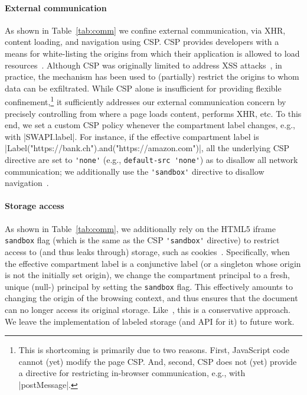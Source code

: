  
\paragraph{External communication}
%
As shown in Table~\ref{tab:comm} we confine external communication,
via XHR, content loading, and navigation using CSP.
%
CSP provides developers with a
means for white-listing the origins from which their application is
allowed to load resources~\cite{csp}.
%
Although CSP was originally limited to address XSS
attacks~\cite{kerschbaum2007simple}, in practice, the mechanism has
been used to (partially) restrict the origins to whom data can be
exfiltrated.
%
While CSP alone is insufficient for providing flexible
confinement,\footnote{
This is shortcoming is primarily due to two reasons. First,
JavaScript code cannot (yet) modify the page CSP.
And, second, CSP does not (yet) provide a directive for restricting 
in-browser communication, e.g., with \js|postMessage|.
}
it sufficiently addresses our external communication concern by
precisely controlling from where a page loads content, performs XHR, etc.
%
To this end, we set a custom CSP policy whenever the compartment label
changes, e.g., with \js|SWAPI.label|.
%
For instance, if the effective compartment label is
\js|Label("https://bank.ch").and("https://amazon.com")|, all the
underlying CSP directive are set to \verb|'none'| (e.g.,
\verb|default-src 'none'|) as to disallow all network communication;
we additionally use the \verb|'sandbox'| directive to disallow
navigation~\cite{csp1.1,whatwg-html,html5}.
%

\paragraph{Storage access}
As shown in Table~\ref{tab:comm}, we additionally rely on the HTML5
iframe \verb|sandbox| flag (which is the same as the CSP
\verb|'sandbox'| directive) to restrict access to (and thus leaks
through) storage, such as cookies~\cite{html5}.
%
Specifically, when the effective compartment label is a conjunctive
label (or a singleton whose origin is not the initially set origin),
we change the compartment principal to a fresh, unique (null-)
principal by setting the \verb|sandbox| flag.
%
This effectively amounts to changing the origin of the browsing
context, and thus ensures that the document can no longer access its
original storage.
%
Like~\cite{Akhawe2013}, this is a conservative approach.
%
We leave the implementation of labeled storage (and API for it) to
future work.


